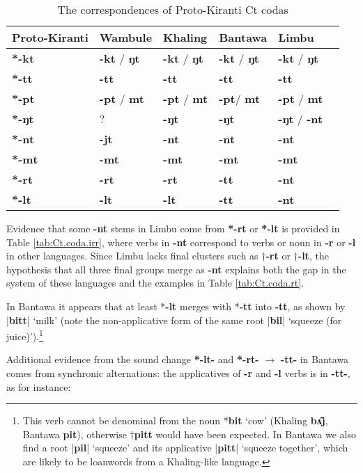 \documentclass[oldfontcommands,oneside,a4paper,11pt]{article}
\newcommand{\ipa}[1]{\textbf{{\phon\mbox{#1}}}} %
\newcommand{\dhatu}[2]{|\ipa{#1}| `#2'}
\begin{document}
\begin{table}[H]
\caption{The correspondences of Proto-Kiranti Ct codas} \centering \label{tab:Ct.coda}
\begin{tabular}{llllll}
\toprule
Proto-Kiranti & Wambule & Khaling & Bantawa & Limbu \\
\midrule
\ipa{*-kt} & \ipa{-kt} / \ipa{ŋt} & \ipa{-kt} / \ipa{ŋt} & \ipa{-kt} / \ipa{ŋt} & \ipa{-kt} / \ipa{ŋt}  \\
\ipa{*-tt} & \ipa{-tt} & \ipa{-tt}  & \ipa{-tt} & \ipa{-tt} \\
\ipa{*-pt} & \ipa{-pt} / \ipa{mt} & \ipa{-pt} / \ipa{mt}& \ipa{-pt}/ \ipa{mt} & \ipa{-pt} / \ipa{mt} \\
\midrule
\ipa{*-ŋt} & ?& \ipa{-ŋt} & \ipa{-ŋt} & \ipa{-ŋt}  / \ipa{-nt} \\
\ipa{*-nt} & \ipa{-jt}  & \ipa{-nt} & \ipa{-nt} & \ipa{-nt}  \\
\ipa{*-mt} & \ipa{-mt} & \ipa{-mt} & \ipa{-mt} & \ipa{-mt}  \\
\midrule
\ipa{*-rt} &  \ipa{-rt}  & \ipa{-rt} & \ipa{-tt}  & \ipa{-nt}  \\
\ipa{*-lt} & \ipa{-lt} & \ipa{-lt} & \ipa{-tt} & \ipa{-nt}  \\
\bottomrule
\end{tabular}
\end{table}

Evidence that some \ipa{-nt} stems in Limbu come from \ipa{*-rt} or \ipa{*-lt} is provided in Table \ref{tab:Ct.coda.irr}, where verbs in \ipa{-nt} correspond to verbs or noun in \ipa{-r} or \ipa{-l} in other languages. Since  Limbu  lacks final clusters such as $\dagger$\ipa{-rt} or $\dagger$\ipa{-lt}, the hypothesis that all three final groups merge as \ipa{-nt} explains both the gap in the system of these languages and the examples in Table \ref{tab:Ct.coda.rt}. 

In Bantawa it appears that at least *\ipa{-lt} merges with *\ipa{-tt} into \ipa{-tt}, as shown by \dhatu{bitt}{milk} (note the non-applicative form of the same root \dhatu{bil}{squeeze (for juice)}).\footnote{This verb cannot be denominal from the noun *\ipa{bit} `cow'  (Khaling \ipa{bʌ̂j}, Bantawa \ipa{pit}), otherwise $\dagger$\ipa{pitt} would have been expected. In Bantawa we also find a root  \dhatu{pil}{squeeze} and its applicative \dhatu{pitt}{squeeze together}, which are likely to be loanwords from a Khaling-like language.}

Additional evidence from the sound change \ipa{*-lt-} and  \ipa{*-rt-} $\rightarrow$ \ipa{-tt-} in Bantawa comes from synchronic alternations: the applicatives of \ipa{-r} and \ipa{-l} verbs is in \ipa{-tt-}, as for instance:
\end{document}
